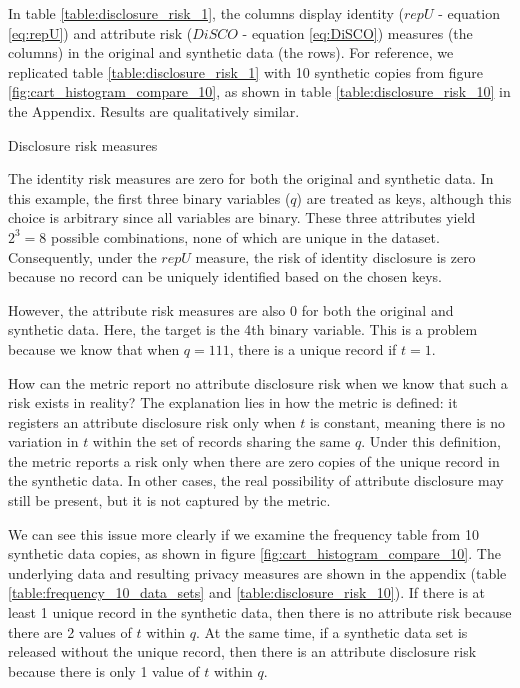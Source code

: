 \documentclass[a4paper,11pt]{style/uneceart}
\begin{document}
In table \ref{table:disclosure_risk_1}, the columns display identity ($repU$ - equation \ref{eq:repU}) and attribute risk ($DiSCO$ - equation \ref{eq:DiSCO}) measures (the columns) in the original and synthetic data (the rows).  For reference, we replicated table \ref{table:disclosure_risk_1} with 10 synthetic copies from figure \ref{fig:cart_histogram_compare_10}, as shown in table \ref{table:disclosure_risk_10} in the Appendix.  Results are qualitatively similar.  

\begin{table}[]
    \centering
    \caption{Disclosure risk measures}
    
    \label{table:disclosure_risk_1}
\end{table}

The identity risk measures are zero for both the original and synthetic data. In this example, the first three binary variables ($q$) are treated as keys, although this choice is arbitrary since all variables are binary. These three attributes yield $2^3 = 8$ possible combinations, none of which are unique in the dataset. Consequently, under the $repU$ measure, the risk of identity disclosure is zero because no record can be uniquely identified based on the chosen keys.

However, the attribute risk measures are also 0 for both the original and synthetic data.  Here, the target is the 4th binary variable.  This is a problem because we know that when $q=111$, there is a unique record if $t=1$.  

How can the metric report no attribute disclosure risk when we know that such a risk exists in reality? The explanation lies in how the metric is defined: it registers an attribute disclosure risk only when $t$ is constant, meaning there is no variation in $t$ within the set of records sharing the same $q$. Under this definition, the metric reports a risk only when there are zero copies of the unique record in the synthetic data. In other cases, the real possibility of attribute disclosure may still be present, but it is not captured by the metric.


We can see this issue more clearly if we examine the frequency table from 10 synthetic data copies, as shown in figure \ref{fig:cart_histogram_compare_10}.  The underlying data and resulting privacy measures are shown in the appendix (table \ref{table:frequency_10_data_sets} and \ref{table:disclosure_risk_10}).  If there is at least 1 unique record in the synthetic data, then there is no attribute risk because there are 2 values of $t$ within $q$.  At the same time, if a synthetic data set is released without the unique record, then there is an attribute disclosure risk because there is only 1 value of $t$ within $q$.  
\end{document}
